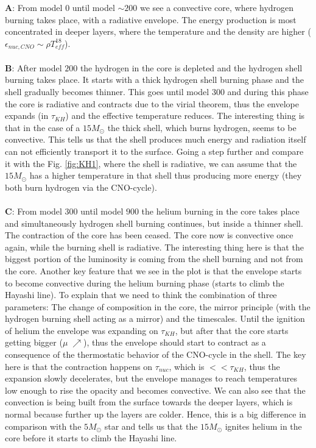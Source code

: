 \documentclass{article}
\begin{document}
\textbf{A}: From model $0$ until model $\sim 200$ we see a convective core, where hydrogen burning takes place, with a radiative envelope. The energy production is most concentrated in deeper layers, where the temperature and the density are higher ($\epsilon_{nuc,CNO} \sim \rho T^{18}_{eff}$). 
\\
\\
\textbf{B}: After model $200$  the hydrogen in the core is depleted and the hydrogen shell burning takes place. It starts with a thick hydrogen shell burning phase and the shell gradually becomes thinner. This goes until model $300$ and during this phase the core is radiative and contracts due to the virial theorem, thus the envelope expands (in $\tau_{KH}$) and the effective temperature reduces. The interesting thing is that in the case of a $15 M_{\odot}$ the thick shell, which burns hydrogen, seems to be convective. This tells us that the shell produces much energy and radiation itself can not efficiently transport it to the surface. Going a step further and compare it with the Fig. \ref{fig:KH1}, where the shell is radiative, we can assume that the $15 M_{\odot}$ has a higher temperature in that shell thus producing more energy (they both burn hydrogen via the CNO-cycle). 
\\
\\
\textbf{C}: From model $300$ until model $900$ the helium burning in the core takes place and simultaneously hydrogen shell burning continues, but inside a thinner shell. The contraction of the core has been ceased. The core now is convective once again, while the burning shell is radiative. The interesting thing here is that the biggest portion of the luminosity is coming from the shell burning and not from the core. Another key feature that we see in the plot is that the envelope starts to become convective during the helium burning phase (starts to climb the Hayashi line). To explain that we need to think the combination of three parameters: The change of composition in the core, the mirror principle (with the hydrogen burning shell acting as a mirror) and the timescales. Until the ignition of helium the envelope was expanding on $\tau_{KH}$, but after that the core starts getting bigger ($\mu \; \nearrow$), thus the envelope should start to contract as a consequence of the thermostatic behavior of the CNO-cycle in the shell. The key here is that the contraction happens on $\tau_{nuc}$, which is $<< \tau_{KH}$, thus the expansion slowly decelerates, but the envelope manages to reach temperatures low enough to rise the opacity and becomes convective. We can also see that the convection is being built from the surface towards the deeper layers, which is normal because further up the layers are colder. Hence, this is a big difference in comparison with the $5 M_{\odot}$ star and tells us that the $15 M_{\odot}$ ignites helium in the core before it starts to climb the Hayashi line.
\end{document}
